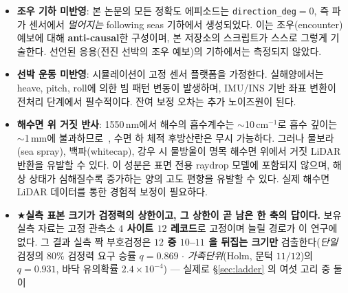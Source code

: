 \documentclass[11pt]{report}
\numberwithin{equation}{chapter}
\numberwithin{figure}{chapter}
\numberwithin{table}{chapter}
\begin{document}
\begin{itemize}
        ($\sim$16\,s at BF4)가 소요되며, 이 기간 동안 추정값이 제공되지 않는다.
        추적과 병행하는 백그라운드 재초기화 방식으로 완화 가능하다.
  \item \textbf{조우 기하 미반영}: 본 논문의 모든 정확도 에피소드는
        \texttt{direction\_deg}$=0$, 즉 파가 센서에서 \emph{멀어지는} following seas
        기하에서 생성되었다. 이는 조우(encounter) 예보에 대해 \textbf{anti-causal}한
        구성이며, 본 저장소의 스크립트가 스스로 그렇게 기술한다.
        선언된 응용(전진 선박의 조우 예보)의 기하에서는 측정되지 않았다.
  \item \textbf{선박 운동 미반영}: 시뮬레이션이 고정 센서 플랫폼을 가정한다.
        실해양에서는 heave, pitch, roll에 의한 빔 패턴 변동이 발생하며,
        IMU/INS 기반 좌표 변환이 전처리 단계에서 필수적이다.
        잔여 보정 오차는 추가 노이즈원이 된다.
  \item \textbf{해수면 위 거짓 반사}: 1550\,nm에서 해수의 흡수계수는 $\sim$10\,cm$^{-1}$로
        흡수 깊이는 $\sim$1\,mm에 불과하므로~\citep{Hale1973}, 수면 하 체적 후방산란은 무시 가능하다.
        그러나 물보라(sea spray), 백파(whitecap), 강우 시 물방울이 명목 해수면 위에서
        거짓 LiDAR 반환을 유발할 수 있다. 이 성분은 표면 전용 raydrop 모델에 포함되지 않으며,
        해상 상태가 심해질수록 증가하는 양의 고도 편향을 유발할 수 있다.
        실제 해수면 LiDAR 데이터를 통한 경험적 보정이 필요하다.
  \item ★\textbf{실측 표본 크기가 검정력의 상한이고, 그 상한이 곧 남은 한 축의 답이다.}
        보유 실측 자료는 고정 관측소 \textbf{$4$ 사이트 $12$ 레코드}로 고정이며 늘릴
        경로가 이 연구에 없다. 그 결과 실측 짝 부호검정은 \textbf{$12$ 중 $10$--$11$ 을
        뒤집는 크기만} 검출한다(\emph{단일} 검정의 $80\%$ 검정력 요구 승률
        $q = 0.869$ $\cdot$ \emph{가족단위}(Holm, 문턱 $11/12$)의 $q = 0.931$, 바닥
        유의확률 $2.4\times10^{-4}$) --- 실제로 \S\ref{sec:ladder} 의 여섯 고리 중 둘이

\end{itemize}
\end{document}
